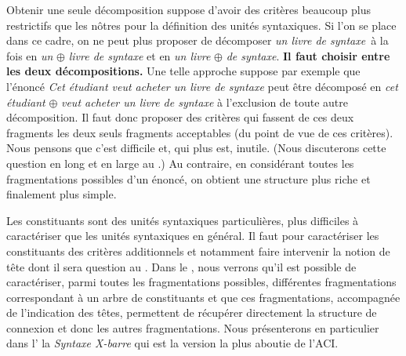 Obtenir une seule décomposition suppose d’avoir des critères beaucoup plus restrictifs que les nôtres pour la définition des unités syntaxiques. Si l’on se place dans ce cadre, on ne peut plus proposer de décomposer \textit{un livre de syntaxe}~à la fois en \textit{un} ${\oplus}$ \textit{livre de syntaxe} et en \textit{un livre} ${\oplus}$ \textit{de syntaxe}. \textbf{Il faut choisir entre les deux décompositions.} Une telle approche suppose par exemple que l’énoncé \textit{Cet étudiant veut acheter un livre de syntaxe} peut être décomposé en \textit{cet étudiant} ${\oplus}$ \textit{veut acheter un livre de syntaxe} à l’exclusion de toute autre décomposition. Il faut donc proposer des critères qui fassent de ces deux fragments les deux seuls fragments acceptables (du point de vue de ces critères). Nous pensons que c’est difficile et, qui plus est, inutile. (Nous discuterons cette question en long et en large au .) Au contraire, en considérant toutes les fragmentations possibles d’un énoncé, on obtient une structure plus riche et finalement plus simple.

Les constituants sont des unités syntaxiques particulières, plus difficiles à caractériser que les unités syntaxiques en général. Il faut pour caractériser les constituants des critères additionnels et notamment faire intervenir la notion de tête dont il sera question au . Dans le , nous verrons qu’il est possible de caractériser, parmi toutes les fragmentations possibles, différentes fragmentations correspondant à un arbre de constituants et que ces fragmentations, accompagnée de l’indication des têtes, permettent de récupérer directement la structure de connexion et donc les autres fragmentations. Nous présenterons en particulier dans l’ la \textit{Syntaxe X-barre} qui est la version la plus aboutie de l’ACI.


